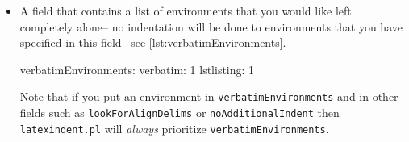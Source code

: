 \begin{itemize}
	\begin{minipage}{.5\textwidth}
		\begin{lstlisting}[caption={\lstinline!tabular! before},label={lst:tabularbefore}]
\begin{tabular}{cccc}
1&	2 &3       &4\\
5& &6       &\\
\end{tabular}
		\end{lstlisting}
	\end{minipage}
	\begin{minipage}{.5\textwidth}
		\begin{lstlisting}[caption={\lstinline!tabular! after},label={lst:tabularafter}]
\begin{tabular}{cccc}
 1 & 2 & 3 & 4 \\
 5 &   & 6 &   \\
\end{tabular}
		\end{lstlisting}
	\end{minipage}
													 		 		 		 		 					
	If you find that \lstinline!latexindent.pl! does not perform satisfactorily on such 
	environments then you can either remove them from \lstinline!lookForAlignDelims! altogether, or set the relevant key to \lstinline!0!, for example \lstinline!tabular: 0!, or if you just want to ignore \emph{specific} 
	instances of the environment, you could wrap them in something from \lstinline!noIndentBlock! (see \cref{lst:noIndentBlock}).
													 		 		 		 		 					
	\item[\verbitem{verbatimEnvironments}] A field that contains a list of environments
	that you would like left completely alone-- no indentation will be done
	to environments that you have specified in this field-- see \cref{lst:verbatimEnvironments}.
													 		 		 		 		 					
	\begin{yaml}[caption={\lstinline!verbatimEnvironments!},label={lst:verbatimEnvironments}]
verbatimEnvironments:
    verbatim: 1
    lstlisting: 1
	\end{yaml}
	Note that if  you put an environment in \lstinline!verbatimEnvironments! 
	and in other fields such as \lstinline!lookForAlignDelims! or \lstinline!noAdditionalIndent! 
	then \lstinline!latexindent.pl! will \emph{always} prioritize \lstinline!verbatimEnvironments!.
													 		 		 		 		 					

\end{itemize}
